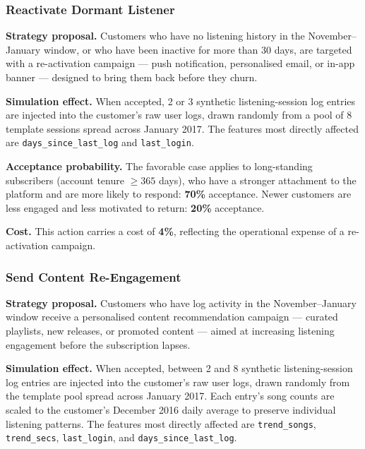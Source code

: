 \documentclass{article}
\begin{document}
\subsubsection{Reactivate Dormant Listener}

\textbf{Strategy proposal.}
Customers who have no listening history in the November–January window, or who have been
inactive for more than 30 days, are targeted with a re-activation campaign — push notification,
personalised email, or in-app banner — designed to bring them back before they churn.

\textbf{Simulation effect.}
When accepted, 2 or 3 synthetic listening-session log entries are injected into the customer's
raw user logs, drawn randomly from a pool of 8 template sessions spread across January 2017.
The features most directly affected are \texttt{days\_since\_last\_log} and
\texttt{last\_login}.

\textbf{Acceptance probability.}
The favorable case applies to long-standing subscribers (account tenure $\geq 365$ days),
who have a stronger attachment to the platform and are more likely to respond: \textbf{70\%}
acceptance. Newer customers are less engaged and less motivated to return: \textbf{20\%}
acceptance.

\textbf{Cost.}
This action carries a cost of \textbf{4\%}, reflecting the operational expense of a
re-activation campaign.


\subsubsection{Send Content Re-Engagement}

\textbf{Strategy proposal.}
Customers who have log activity in the November–January window receive a personalised
content recommendation campaign — curated playlists, new releases, or promoted content —
aimed at increasing listening engagement before the subscription lapses.

\textbf{Simulation effect.}
When accepted, between 2 and 8 synthetic listening-session log entries are injected into the
customer's raw user logs, drawn randomly from the template pool spread across January 2017.
Each entry's song counts are scaled to the customer's December 2016 daily average to preserve
individual listening patterns. The features most directly affected are \texttt{trend\_songs},
\texttt{trend\_secs}, \texttt{last\_login}, and \texttt{days\_since\_last\_log}.
\end{document}
